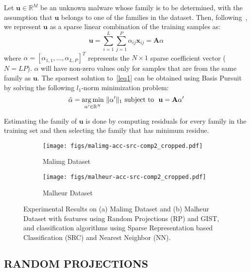 \documentclass[journal]{IEEEtran}
\DeclareMathOperator*{\argmin}{arg\,min}
\DeclarePairedDelimiter{\norm}{\lVert}{\rVert}
\begin{document}
Let $\mathbf{u} \in \mathbb{R}^M$ be an unknown malware whose family is to be determined, with the assumption that $\mathbf{u}$ belongs to one of the families in the dataset. 
Then, following~\cite{2009-pami-wright-face}, we represent $\mathbf{u}$ as a sparse linear combination of the training samples as:
\begin{equation}\label{leq1}
\mathbf{u} = \sum\limits_{i=1}^L \sum\limits_{j=1}^P \alpha_{ij} \mathbf{x}_{ij} = \mathbf{A}\alpha
\end{equation} 
where $\alpha = [\alpha_{1,1},...,\alpha_{L,P}]^T$ represents the $N \times 1$ sparse coefficient vector ($N = LP$).
$\alpha$ will have non-zero values only for samples that are from the same family as $\mathbf{u}$. 
The sparsest solution to~\eqref{leq1} can be obtained using Basis Pursuit~\cite{2011-jay-pami} by solving the following $l_1$-norm minimization problem:
\begin{equation}
\hat{\alpha} = \argmin_{\alpha' \in \mathbb{R}^N} \ \norm{\alpha'}_1 \ \text{subject to} \ \ \mathbf{u} = \mathbf{A}\alpha'
\label{leq2}
\end{equation}


Estimating the family of $\mathbf{u}$ is done by computing residuals for every family in the training set and then selecting the family that has minimum residue.

\begin{figure*}[ht]
\centering 
\begin{subfigure}[h]{0.49\textwidth}
{\texttt{[image: figs/malimg-acc-src-comp2\_cropped.pdf]}}    
\caption{Malimg Dataset}
\label{exps-res-malimg}
\end{subfigure}
\begin{subfigure}[h]{0.49\textwidth}
{\texttt{[image: figs/malheur-acc-src-comp2\_cropped.pdf]}} 
\caption{Malheur Dataset}
\label{exps-res-malheur}
\end{subfigure}
\vspace{-5pt}
\caption{Experimental Results on (a) Malimg Dataset and (b)  Malheur Dataset with features using Random Projections (RP) and GIST, and classification algorithms using Sparse Representation based Classification (SRC) and Nearest Neighbor (NN).
}
\label{exps-res}
\vspace{-5pt}
\end{figure*}


\subsection*{RANDOM PROJECTIONS}
\end{document}

